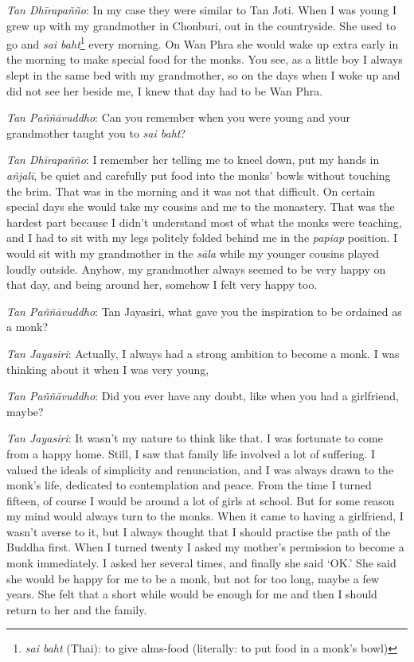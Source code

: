 \emph{Tan Dhīrapañño}: In my case they were similar to Tan Joti. When I
was young I grew up with my grandmother in Chonburi, out in the
countryside. She used to go and \emph{sai baht}\footnote{\emph{sai baht}
(Thai): to give alms-food (literally: to put food in a monk's bowl)}
every morning. On Wan Phra she would wake up extra early in the morning
to make special food for the monks. You see, as a little boy I always
slept in the same bed with my grandmother, so on the days when I woke up
and did not see her beside me, I knew that day had to be Wan Phra. 

\emph{Tan Paññāvuddho}: Can you remember when you were young and your
grandmother taught you to \emph{sai baht}? 

\emph{Tan Dhīrapañño}: I remember her telling me to kneel down, put my
hands in \emph{añjalī}, be quiet and carefully put food into the monks'
bowls without touching the brim. That was in the morning and it was not
that difficult. On certain special days she would take my cousins and me
to the monastery. That was the hardest part because I didn't understand
most of what the monks were teaching, and I had to sit with my legs
politely folded behind me in the \emph{papiap} position. I would sit
with my grandmother in the \emph{sāla} while my younger cousins played
loudly outside. Anyhow, my grandmother always seemed to be very happy on
that day, and being around her, somehow I felt very happy too. 

\emph{Tan Paññāvuddho}: Tan Jayasiri, what gave you the inspiration to
be ordained as a monk? 

\emph{Tan Jayasiri}: Actually, I always had a strong ambition to become
a monk. I was thinking about it when I was very young, 

\emph{Tan Paññāvuddho}: Did you ever have any doubt, like when you had
a girlfriend, maybe? 

\emph{Tan Jayasiri}: It wasn't my nature to think like that. I was
fortunate to come from a happy home. Still, I saw that family life
involved a lot of suffering. I valued the ideals of simplicity and
renunciation, and I was always drawn to the monk's life, dedicated to
contemplation and peace. From the time I turned fifteen, of course I
would be around a lot of girls at school. But for some reason my mind
would always turn to the monks. When it came to having a girlfriend, I
wasn't averse to it, but I always thought that I should practise the
path of the Buddha first. When I turned twenty I asked my mother's
permission to become a monk immediately. I asked her several times, and
finally she said `OK.' She said she would be happy for me to be a
monk, but not for too long, maybe a few years. She felt that a short
while would be enough for me and then I should return to her and the
family. 

